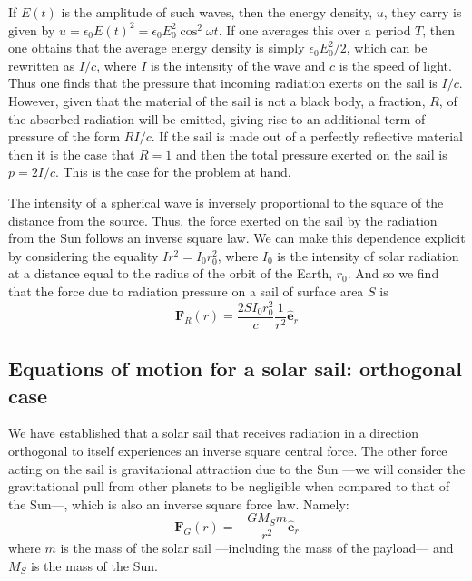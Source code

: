 \documentclass[twocolumn,12pt,a4paper]{article}
\numberwithin{equation}{section}
\begin{document}
If \( E(t) \) is the amplitude of such waves, then the energy density, \( u \), they carry is given by \( u = \epsilon_0 E(t)^2 = \epsilon_0 E_0^2 \cos^2{\omega t} \). If one averages this over a period \( T \), then one obtains that the average energy density is simply \( \epsilon_0 E_0^2 /2 \), which can be rewritten as \( I/c \), where \( I \) is the intensity of the wave and \( c \) is the speed of light. Thus one finds that the pressure that incoming radiation exerts on the sail is \( I/c \). However, given that the material of the sail is not a black body, a fraction, \( R \), of the absorbed radiation will be emitted, giving rise to an additional term of pressure of the form \( RI/c \). If the sail is made out of a perfectly reflective material then it is the case that \( R = 1 \) and then the total pressure exerted on the sail is \( p = 2I/c \). This is the case for the problem at hand.

The intensity of a spherical wave is inversely proportional to the square of the distance from the source. Thus, the force exerted on the sail by the radiation from the Sun follows an inverse square law. We can make this dependence explicit by considering the equality \( Ir^2 = I_0 r^2_0 \), where \( I_0 \) is the intensity of solar radiation at a distance equal to the radius of the orbit of the Earth, \( r_0 \). And so we find that the force due to radiation pressure on a sail of surface area \( S \) is
\begin{equation}
 	\mathbf{F}_R(r) = \dfrac{2SI_0r_0^2}{c}\dfrac{1}{r^2} \mathbf{\hat{e}}_r \label{eq:radiation force}
\end{equation}

\subsection{Equations of motion for a solar sail: orthogonal case}
We have established that a solar sail that receives radiation in a direction orthogonal to itself experiences an inverse square central force. The other force acting on the sail is gravitational attraction due to the Sun ---we will consider the gravitational pull from other planets to be negligible when compared to that of the Sun---, which is also an inverse square force law. Namely:
\begin{equation}
 	\mathbf{F}_G(r) = -\dfrac{G M_S m}{r^2} \mathbf{\hat{e}}_r \label{eq:gravitational force}
\end{equation}
where \( m \) is the mass of the solar sail ---including the mass of the payload--- and \( M_S \) is the mass of the Sun.
\end{document}

